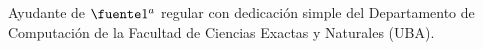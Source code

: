 

    

%

\item[Agosto 2014 - a la fecha] Ayudante de $\fuente 1^{a}$
	regular con dedicaci\'on simple del
    Departamento de Computaci\'on de la Facultad de
    Ciencias Exactas y Naturales (UBA).


